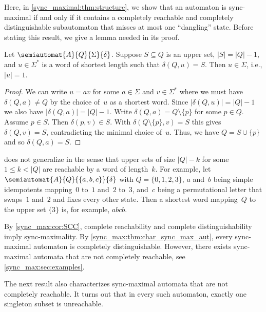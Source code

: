 
Here, in \cref{sync_maximal:thm:structure}, 
we show that an automaton is sync-maximal if and only if it contains a completely reachable
and completely distinguishable subautomaton
that misses at most one ``dangling'' state.
Before stating this result, we give a lemma needed in its proof.

\begin{lemma}
	\label{sync_maximal:lem:n-1-upperset}
	Let $\semiautomat{A}{Q}{\Sigma}{\delta}$.
	Suppose $S \subseteq Q$
	is an upper set, $|S| = |Q| - 1$,
	and $u \in \Sigma^*$
	is a word of shortest length such that $\delta(Q, u) = S$.
	Then $u \in \Sigma$, i.e., $|u| = 1$.
\end{lemma}
\begin{proof}
	We can write $u = av$ for some $a \in \Sigma$ and $v \in \Sigma^*$
	where we must have $\delta(Q, a) \ne Q$
	by the choice of~$u$ as a shortest word.
	Since $|\delta(Q, u)| = |Q| - 1$
	we also have $|\delta(Q, a)| = |Q| - 1$.
	Write $\delta(Q, a) = Q \setminus \{p\}$ for some $p \in Q$.
	Assume $p \in S$.
	Then $\delta(p, v) \in S$.
	With $\delta(Q \setminus \{p\}, v) = S$
	this gives $\delta(Q, v) = S$, contradicting the minimal
	choice of~$u$. Thus, we have $Q = S \cup \{p\}$
	and so $\delta(Q, a) = S$.
\end{proof}

\begin{remark}
	 does not generalize
	in the sense that upper sets of size $|Q| - k$
	for some $1 \le k < |Q|$ are reachable
	by a word of length~$k$.
	For example, let $\semiautomat{A}{Q}{\{a,b,c\}}{\delta}$
	with $Q = \{0,1,2,3\}$,
	$a$ and~$b$ being simple idempotents
	mapping~$0$ to~$1$ and~$2$ to~$3$,
	and~$c$ being a permutational letter
	that swaps~$1$ and~$2$ and fixes
	every other state.
	Then a shortest word mapping~$Q$
	to the upper set $\{3\}$
    is, for example, $abcb$.
\end{remark}

By \cref{sync_max:cor:SCC}, complete reachability and complete distinguishability imply sync-maximality. By \cref{sync_max:thm:char_sync_max_aut}, every sync-maximal automaton is completely distinguishable. However, 
there exists sync-maximal automata that are not completely reachable, see \cref{sync_max:sec:examples}.

The next result also characterizes sync-maximal automata that are not completely reachable. It turns out that in every such automaton, exactly one singleton subset is unreachable.


